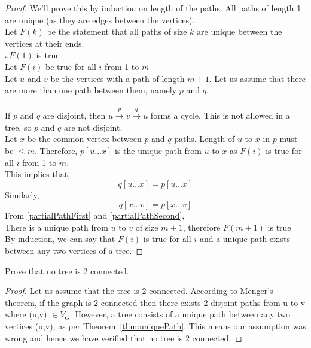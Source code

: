 \documentclass{article}
\begin{document}
\begin{proof}
    We'll prove this by induction on length of the paths. All paths of length 1 are unique (as they are edges between the vertices).\\
    Let $F(k)$ be the statement that all paths of size $k$ are unique between the vertices at their ends.\\
    $\therefore F(1)$ is true\\
    Let $F(i)$ be true for all $i$ from 1 to $m$\\
    Let $u$ and  $v$ be the vertices with a path of length $m+1$. Let us assume that there are more than one path between them, namely $p$ and $q$.\\
    \\
    If $p$ and $q$ are disjoint, then $u\xrightarrow{p}v\xrightarrow{q}u$ forms a cycle. This is not allowed in a tree, so $p$ and $q$ are not disjoint.\\
    Let $x$ be the common vertex between $p$ and $q$ paths. Length of $u$ to $x$ in $p$ must be $\leq m$. Therefore, $p[u\dots x]$ is the unique path from $u$ to $x$ as $F(i)$ is true for all $i$ from 1 to $m$.\\ 
    This implies that,\\
    \begin{equation}
        \label{partialPathFirst}
        q[u\dots x] = p[u\dots x]
    \end{equation}
    Similarly,
    \begin{equation}
        \label{partialPathSecond}
        q[x\dots v] = p[x\dots v]
    \end{equation}
    From \ref{partialPathFirst} and \ref{partialPathSecond},\\
    There is a unique path from $u$ to $v$ of size $m+1$, therefore $F(m+1)$ is true\\
    By induction, we can say that $F(i)$ is true for all $i$ and a unique path exists between any two vertices of a tree.

\end{proof}


\begin{corollary}
    Prove that no tree is 2 connected.
    \begin{proof}
        Let us assume that the tree is 2 connected. According to Menger's theorem, if the graph is 2 connected then there exists 2 disjoint paths from u to v where (u,v) $\in V_G$. However, a tree consists of a unique path between any two vertices (u,v), as per Theorem~\ref{thm:uniquePath}. This means our assumption was wrong and hence we have verified that no tree is 2 connected.
    \end{proof}
\end{corollary}
\end{document}
